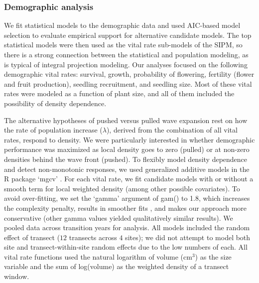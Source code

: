 \documentclass[11pt]{article}\usepackage[]{graphicx}\usepackage[usenames,dvipsnames]{xcolor}
\begin{document}
\subsubsection*{Demographic analysis}
We fit statistical models to the demographic data and used AIC-based model selection to evaluate empirical support for alternative candidate models. 
The top statistical models were then used as the vital rate sub-models of the SIPM, so there is a strong connection between the statistical and population modeling, as is typical of integral projection modeling. 
Our analyses focused on the following demographic vital rates: survival, growth, probability of flowering, fertility (flower and fruit production), seedling recruitment, and seedling size. 
Most of these vital rates were modeled as a function of plant size, and all of them included the possibility of density dependence. 

The alternative hypotheses of pushed versus pulled wave expansion rest on how the rate of population increase ($\lambda$), derived from the combination of all vital rates, respond to density. 
We were particularly interested in whether demographic performance was maximized as local density goes to zero (pulled) or at non-zero densities behind the wave front (pushed). 
To flexibly model density dependence and detect non-monotonic responses, we used generalized additive models in the R package `mgcv' \citep{Wood2017}.
For each vital rate, we fit candidate models with or without a smooth term for local weighted density (among other possible covariates). 
To avoid over-fitting, we set the `gamma' argument of gam() to 1.8, which increases the complexity penalty, results in smoother fits \citep{Wood2017}, and makes our approach more conservative (other gamma values yielded qualitatively similar results).
We pooled data across transition years for analysis. 
All models included the random effect of transect ($12$ transects across $4$ sites); we did not attempt to model both site and transect-within-site random effects due to the low numbers of each. 
All vital rate functions used the natural logarithm of volume (cm$^3$) as the size variable and the sum of log(volume) as the weighted density of a transect window.
\end{document}
